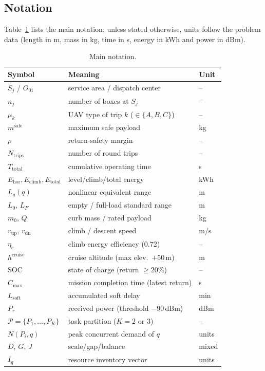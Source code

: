 \documentclass[journal]{IEEEtran}
\begin{document}
\subsection{Notation}
Table~\ref{tab:notation} lists the main notation; unless stated otherwise, units
follow the problem data (length in m, mass in kg, time in s, energy in kWh and
power in dBm).
\begin{table}[t]
\caption{Main notation.}
\label{tab:notation}
\centering
\setlength{\tabcolsep}{4pt}
\begin{tabular}{lll}
\toprule
Symbol & Meaning & Unit \\
\midrule
$S_j$ / $O_{01}$ & service area / dispatch center & -- \\
$n_j$ & number of boxes at $S_j$ & -- \\
$\mu_k$ & UAV type of trip $k$ ($\in\{A,B,C\}$) & -- \\
$m^{\mathrm{safe}}$ & maximum safe payload & kg \\
$\rho$ & return-safety margin & -- \\
$N_{\mathrm{trips}}$ & number of round trips & -- \\
$T_{\mathrm{total}}$ & cumulative operating time & s \\
\midrule
$E_{\mathrm{hor}},E_{\mathrm{climb}},E_{\mathrm{total}}$ & level/climb/total energy & kWh \\
$L_g(q)$ & nonlinear equivalent range & m \\
$L_0$, $L_F$ & empty / full-load standard range & m \\
$m_0$, $Q$ & curb mass / rated payload & kg \\
$v_{\mathrm{up}}$, $v_{\mathrm{dn}}$ & climb / descent speed & m/s \\
$\eta_c$ & climb energy efficiency ($0.72$) & -- \\
$h^{\mathrm{cruise}}$ & cruise altitude (max elev.\ $+50$\,m) & m \\
SOC & state of charge (return $\ge20\%$) & -- \\
$C_{\max}$ & mission completion time (latest return) & s \\
$L_{\mathrm{soft}}$ & accumulated soft delay & min \\
$P_r$ & received power (threshold $-90$\,dBm) & dBm \\
$\mathcal{P}=\{P_1,\dots,P_K\}$ & task partition ($K{=}2$ or $3$) & -- \\
$N(P_i,q)$ & peak concurrent demand of $q$ & units \\
$D$, $G$, $J$ & scale/gap/balance & mixed \\
$I_q$ & resource inventory vector & units \\
\bottomrule
\end{tabular}
\end{table}
\end{document}
